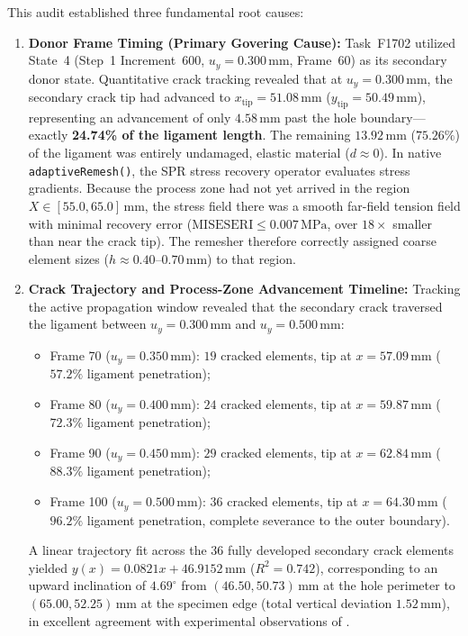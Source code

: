 This audit established three fundamental root causes:
\begin{enumerate}
  \item \textbf{Donor Frame Timing (Primary Govering Cause):}
  Task~F1702 utilized State~4 (Step~1 Increment~600, $u_y = 0.300\,\mathrm{mm}$, Frame~60) as its secondary donor state. Quantitative crack tracking revealed that at $u_y = 0.300\,\mathrm{mm}$, the secondary crack tip had advanced to $x_{\mathrm{tip}} = 51.08\,\mathrm{mm}$ ($y_{\mathrm{tip}} = 50.49\,\mathrm{mm}$), representing an advancement of only $4.58\,\mathrm{mm}$ past the hole boundary---exactly \textbf{24.74\% of the ligament length}. The remaining $13.92\,\mathrm{mm}$ ($75.26\%$) of the ligament was entirely undamaged, elastic material ($d \approx 0$). In native \Abaqus \texttt{adaptiveRemesh()}, the SPR stress recovery operator evaluates stress gradients. Because the process zone had not yet arrived in the region $X \in [55.0, 65.0]\,\mathrm{mm}$, the stress field there was a smooth far-field tension field with minimal recovery error ($\mathrm{MISESERI} \le 0.007\,\mathrm{MPa}$, over $18\times$ smaller than near the crack tip). The remesher therefore correctly assigned coarse element sizes ($h \approx 0.40$--$0.70\,\mathrm{mm}$) to that region.
  \item \textbf{Crack Trajectory and Process-Zone Advancement Timeline:}
  Tracking the active propagation window revealed that the secondary crack traversed the ligament between $u_y = 0.300\,\mathrm{mm}$ and $u_y = 0.500\,\mathrm{mm}$:
  \begin{itemize}
    \item Frame 70 ($u_y = 0.350\,\mathrm{mm}$): $19$ cracked elements, tip at $x = 57.09\,\mathrm{mm}$ ($57.2\%$ ligament penetration);
    \item Frame 80 ($u_y = 0.400\,\mathrm{mm}$): $24$ cracked elements, tip at $x = 59.87\,\mathrm{mm}$ ($72.3\%$ ligament penetration);
    \item Frame 90 ($u_y = 0.450\,\mathrm{mm}$): $29$ cracked elements, tip at $x = 62.84\,\mathrm{mm}$ ($88.3\%$ ligament penetration);
    \item Frame 100 ($u_y = 0.500\,\mathrm{mm}$): $36$ cracked elements, tip at $x = 64.30\,\mathrm{mm}$ ($96.2\%$ ligament penetration, complete severance to the outer boundary).
  \end{itemize}
  A linear trajectory fit across the $36$ fully developed secondary crack elements yielded $y(x) = 0.0821 x + 46.9152\,\mathrm{mm}$ ($R^2 = 0.742$), corresponding to an upward inclination of $4.69^\circ$ from $(46.50, 50.73)\,\mathrm{mm}$ at the hole perimeter to $(65.00, 52.25)\,\mathrm{mm}$ at the specimen edge (total vertical deviation $1.52\,\mathrm{mm}$), in excellent agreement with experimental observations of \citet{ambati2015}.

\end{enumerate}
